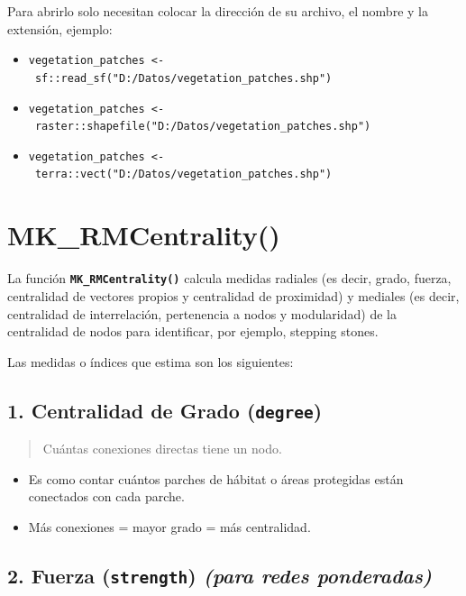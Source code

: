 \documentclass[
]{book}
\providecommand{\tightlist}{%
  \setlength{\itemsep}{0pt}\setlength{\parskip}{0pt}}
\begin{document}
Para abrirlo solo necesitan colocar la dirección de su archivo, el nombre y la extensión, ejemplo:

\begin{itemize}
\item
  \texttt{vegetation\_patches\ \textless{}-\ sf::read\_sf("D:/Datos/vegetation\_patches.shp")}
\item
  \texttt{vegetation\_patches\ \textless{}-\ raster::shapefile("D:/Datos/vegetation\_patches.shp")}
\item
  \texttt{vegetation\_patches\ \textless{}-\ terra::vect("D:/Datos/vegetation\_patches.shp")}
\end{itemize}

\section{MK\_RMCentrality()}\label{mk_rmcentrality}

La función \textbf{\texttt{MK\_RMCentrality()}} calcula medidas radiales (es decir, grado, fuerza, centralidad de vectores propios y centralidad de proximidad) y mediales (es decir, centralidad de interrelación, pertenencia a nodos y modularidad) de la centralidad de nodos para identificar, por ejemplo, stepping stones.

Las medidas o índices que estima son los siguientes:

\subsection{\texorpdfstring{1. Centralidad de Grado (\texttt{degree})}{1. Centralidad de Grado (degree)}}\label{centralidad-de-grado-degree}

\begin{quote}
Cuántas conexiones directas tiene un nodo.
\end{quote}

\begin{itemize}
\tightlist
\item
  Es como contar cuántos parches de hábitat o áreas protegidas están conectados con cada parche.
\item
  Más conexiones = mayor grado = más centralidad.
\end{itemize}

\subsection{\texorpdfstring{2. Fuerza (\texttt{strength}) \emph{(para redes ponderadas)}}{2. Fuerza (strength) (para redes ponderadas)}}\label{fuerza-strength-para-redes-ponderadas}
\end{document}
